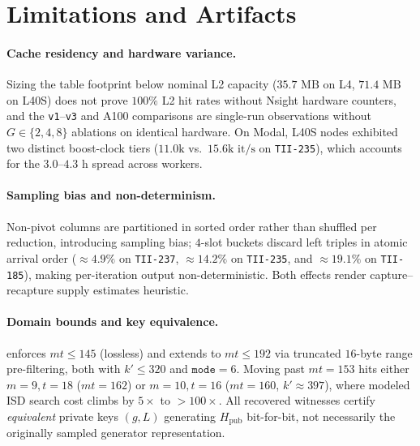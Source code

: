 \documentclass[11pt,a4paper]{article}
\begin{document}
\section{Limitations and Artifacts}
\label{sec:limits}

\paragraph{Cache residency and hardware variance.}
Sizing the table footprint below nominal L2 capacity ($35.7\text{ MB}$ on L4, $71.4\text{ MB}$ on L40S) does not prove $100\%$ L2 hit rates without Nsight hardware counters, and the \texttt{v1}--\texttt{v3} and A100 comparisons are single-run observations without $G \in \{2, 4, 8\}$ ablations on identical hardware. On Modal, L40S nodes exhibited two distinct boost-clock tiers ($11.0\text{k}$ vs.\ $15.6\text{k it/s}$ on \texttt{TII-235}), which accounts for the $3.0\text{--}4.3\text{ h}$ spread across workers.

\paragraph{Sampling bias and non-determinism.}
Non-pivot columns are partitioned in sorted order rather than shuffled per reduction, introducing sampling bias; $4$-slot buckets discard left triples in atomic arrival order ($\approx 4.9\%$ on \texttt{TII-237}, $\approx 14.2\%$ on \texttt{TII-235}, and $\approx 19.1\%$ on \texttt{TII-185}), making per-iteration output non-deterministic. Both effects render capture--recapture supply estimates heuristic.

\paragraph{Domain bounds and key equivalence.}
 enforces $mt \le 145$ (lossless) and  extends to $mt \le 192$ via truncated $16$-byte range pre-filtering, both with $k' \le 320$ and $\texttt{mode}=6$. Moving past $mt=153$ hits either $m=9, t=18$ ($mt=162$) or $m=10, t=16$ ($mt=160$, $k' \approx 397$), where modeled ISD search cost climbs by $5\times$ to $>100\times$. All recovered witnesses certify \emph{equivalent} private keys $(g, L)$ generating $H_{\mathrm{pub}}$ bit-for-bit, not necessarily the originally sampled generator representation.
\end{document}
